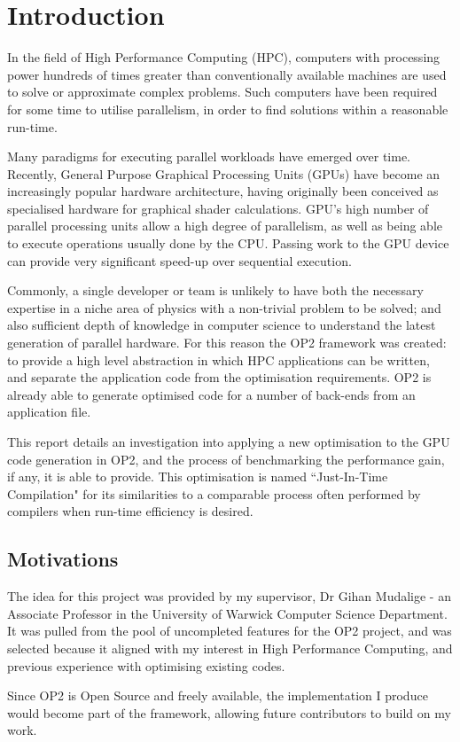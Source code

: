 
\section{Introduction}

In the field of High Performance Computing (HPC), computers with processing power hundreds of times greater than conventionally available machines are used to solve or approximate complex problems. Such computers have been required for some time to utilise parallelism, in order to find solutions within a reasonable run-time.
\par Many paradigms for executing parallel workloads have emerged over time. Recently, General Purpose Graphical Processing Units (GPUs) have become an increasingly popular hardware architecture, having originally been conceived as specialised hardware for graphical shader calculations. GPU's high number of parallel processing units allow a high degree of parallelism, as well as being able to execute operations usually done by the CPU. Passing work to the GPU device can provide very significant speed-up over sequential execution.
\par
Commonly, a single developer or team is unlikely to have both the necessary expertise in a niche area of physics with a non-trivial problem to be solved; and also sufficient depth of knowledge in computer science to understand the latest generation of parallel hardware. For this reason the OP2 framework was created: to provide a high level abstraction in which HPC applications can be written, and separate the application code from the optimisation requirements. OP2 is already able to generate optimised code for a number of back-ends from an application file.
\par
This report details an investigation into applying a new optimisation to the GPU code generation in OP2, and the process of benchmarking the performance gain, if any, it is able to provide.
This optimisation is named ``Just-In-Time Compilation" for its similarities to a comparable process often performed by compilers when run-time efficiency is desired.
\vfill
\subsection{Motivations}
The idea for this project was provided by my supervisor, Dr Gihan Mudalige - an Associate Professor in the University of Warwick Computer Science Department. It was pulled from the pool of uncompleted features for the OP2 project, and was selected because it aligned with my interest in High Performance Computing, and previous experience with optimising existing codes.
\par
Since OP2 is Open Source and freely available, the implementation I produce would become part of the framework, allowing future contributors to build on my work.

